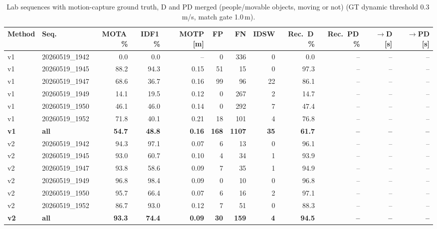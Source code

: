 \begin{table}[t]
\centering
\caption{Lab sequences with motion-capture ground truth, D and PD merged (people/movable objects, moving or not) (GT dynamic threshold 0.3\,m/s, match gate 1.0\,m).}
\label{tab:own_mocap_merged}
\setlength{\tabcolsep}{3pt}
\begin{tabular}{llrrrrrrrrrr}
\toprule
Method & Seq. & MOTA\,\% & IDF1\,\% & MOTP [m] & FP & FN & IDSW & Rec.\ D\,\% & Rec.\ PD\,\% & $\to$D [s] & $\to$PD [s] \\
\midrule
v1 & 20260519\_1942 & 0.0 & 0.0 & -- & 0 & 336 & 0 & 0.0 & -- & -- & -- \\
v1 & 20260519\_1945 & 88.2 & 94.3 & 0.15 & 51 & 15 & 0 & 97.3 & -- & -- & -- \\
v1 & 20260519\_1947 & 68.6 & 36.7 & 0.16 & 99 & 96 & 22 & 86.1 & -- & -- & -- \\
v1 & 20260519\_1949 & 14.1 & 19.5 & 0.12 & 0 & 267 & 2 & 14.7 & -- & -- & -- \\
v1 & 20260519\_1950 & 46.1 & 46.0 & 0.14 & 0 & 292 & 7 & 47.4 & -- & -- & -- \\
v1 & 20260519\_1952 & 71.8 & 40.1 & 0.21 & 18 & 101 & 4 & 76.8 & -- & -- & -- \\
\textbf{v1} & \textbf{all} & \textbf{54.7} & \textbf{48.8} & \textbf{0.16} & \textbf{168} & \textbf{1107} & \textbf{35} & \textbf{61.7} & \textbf{--} & \textbf{--} & \textbf{--} \\
\midrule
v2 & 20260519\_1942 & 94.3 & 97.1 & 0.07 & 6 & 13 & 0 & 96.1 & -- & -- & -- \\
v2 & 20260519\_1945 & 93.0 & 60.7 & 0.10 & 4 & 34 & 1 & 93.9 & -- & -- & -- \\
v2 & 20260519\_1947 & 93.8 & 58.6 & 0.09 & 7 & 35 & 1 & 94.9 & -- & -- & -- \\
v2 & 20260519\_1949 & 96.8 & 98.4 & 0.09 & 0 & 10 & 0 & 96.8 & -- & -- & -- \\
v2 & 20260519\_1950 & 95.7 & 66.4 & 0.07 & 6 & 16 & 2 & 97.1 & -- & -- & -- \\
v2 & 20260519\_1952 & 86.7 & 93.0 & 0.12 & 7 & 51 & 0 & 88.3 & -- & -- & -- \\
\textbf{v2} & \textbf{all} & \textbf{93.3} & \textbf{74.4} & \textbf{0.09} & \textbf{30} & \textbf{159} & \textbf{4} & \textbf{94.5} & \textbf{--} & \textbf{--} & \textbf{--} \\
\bottomrule
\end{tabular}
\end{table}
